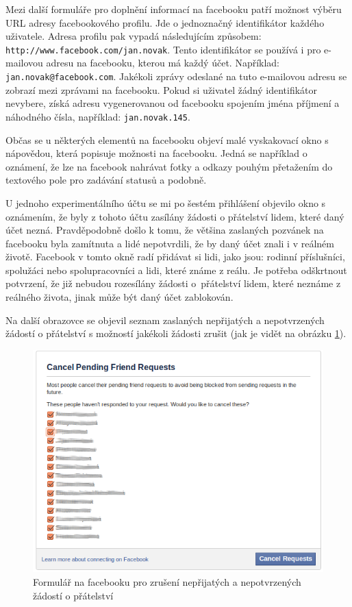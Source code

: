 \documentclass[thesis=M,czech]{FITthesis}[2013/05/10]
\begin{document}
Mezi další formuláře pro doplnění informací na facebooku patří možnost výběru URL adresy facebookového profilu. Jde o jednoznačný identifikátor každého uživatele. Adresa profilu pak vypadá následujícím způsobem: \verb|http://www.facebook.com/jan.novak|. Tento identifikátor se používá i pro e-mailovou adresu na facebooku, kterou má každý účet. Například: \verb|jan.novak@facebook.com|. Jakékoli zprávy odeslané na tuto e-mailovou adresu se zobrazí mezi zprávami na facebooku. Pokud si uživatel žádný identifikátor nevybere, získá adresu vygenerovanou od facebooku spojením jména příjmení a náhodného čísla, například: \verb|jan.novak.145|.

Občas se u některých elementů na facebooku objeví malé vyskakovací okno s nápovědou, která popisuje možnosti na facebooku. Jedná se například o oznámení, že lze na facebook nahrávat fotky a odkazy pouhým přetažením do textového pole pro zadávání statusů a podobně. 

U jednoho experimentálního účtu se mi po šestém přihlášení  objevilo okno s oznámením, že byly z tohoto účtu zasílány žádosti o přátelství lidem, které daný účet nezná. Pravděpodobně došlo k tomu, že většina zaslaných pozvánek na facebooku byla zamítnuta a lidé nepotvrdili, že by daný účet znali i v reálném životě. Facebook v tomto okně radí přidávat si lidi, jako jsou: rodinní příslušníci, spolužáci nebo spolupracovníci a lidi, které známe z reálu. Je potřeba odškrtnout potvrzení, že již nebudou rozesílány žádosti o~přátelství lidem, které neznáme z reálného života, jinak může být daný účet zablokován.

Na další obrazovce se objevil seznam zaslaných nepřijatých a nepotvrzených žádostí o přátelství s možností jakékoli žádosti zrušit (jak je vidět na obrázku \ref{fig:cancelPendingFrinedRequests}).

\begin{figure}[h]
\begin{center}
\includegraphics[width=5in]{figures/cancelPendingFriendRequests.png}
\caption{Formulář na facebooku pro zrušení nepřijatých  a nepotvrzených žádostí o přátelství}
\label{fig:cancelPendingFrinedRequests}
\end{center}
\end{figure}
\end{document}
